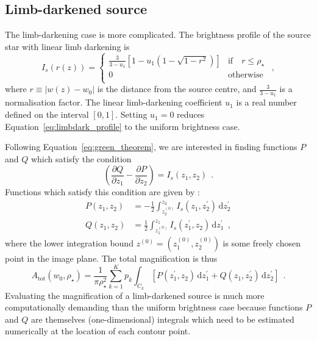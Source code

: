 \documentclass[12pt,dvipsnames]{report}
\newcommand{\ud}{\,\mathrm{d}}
\newcommand{\hquad}{~~}
\begin{document}
\subsection{Limb-darkened source}
\label{ssec:mag_limbdark}
The limb-darkening case is more complicated. The brightness profile of the source star with
linear limb darkening is 
\begin{equation}
    I_s(r(z))=
    \begin{cases}\frac{3}{3-u_1}\left[1 - u_1\left(1 - \sqrt{1-r^2}\right)\right] &\text{if} \quad r\leq\rho_\star\\
        0 &\text{otherwise}\\
    \end{cases}
    \hquad,
    \label{eq:limbdark_profile}
\end{equation}
where $r\equiv |w(z)-w_0|$ is the distance from the source centre, and $\frac{3}{3-u_1}$ is a 
normalisation factor. The linear limb-darkening coefficient $u_1$
is a real number defined on the interval $[0,1]$. Setting $u_1=0$ reduces 
Equation~\ref{eq:limbdark_profile} to the uniform brightness case.

Following Equation~\ref{eq:green_theorem}, we are interested in finding 
functions $P$ and $Q$ which satisfy the condition
\begin{equation}
\left(\frac{\partial Q}{\partial z_{1}} - 
\frac{\partial P}{\partial z_{2}} \right) = I_s(z_1,z_2)
\hquad.
\end{equation}
Functions which satisfy this condition are given by \citep{1998A&A...333L..79D}:
\begin{align}
P\left(z_1, z_2\right)&=-\frac{1}{2} \int_{z_2^{(0)}}^{z_2} I_s\left(z_1, z_2^{\prime}\right) \ud z_2^{\prime}\\
Q\left(z_1, z_2\right)&=\frac{1}{2} \int_{z_1^{(0)}}^{z_1} I_s\left(z_1^{\prime}, z_2\right) \ud z_1^{\prime}
\hquad,
\label{eq:p_and_q_functions_ld}
\end{align}
where the lower integration bound $z^{(0)}=(z_1^{(0)},z_2^{(0)})$ is some freely chosen point
in the image plane. The total magnification is thus 
\begin{equation}
    A_\mathrm{tot}\left(w_0, \rho_{\star}\right)=\frac{1}{\pi \rho_{\star}^{2}}
    \sum_{k=1}^Kp_k\int_{C_k} \left[P(z_1^\prime, z_2)\ud z_1^\prime + Q(z_1, z_2^\prime)\ud z_2^\prime\right]
    \hquad.
    \label{eq:mag_green_theorem_ld_expanded}
\end{equation}
Evaluating the magnification of a limb-darkened source is much 
more computationally demanding than the uniform brightness case  because functions $P$ and
$Q$ are themselves (one-dimensional) integrals which need to be estimated numerically at the location of 
each contour point.
\end{document}
